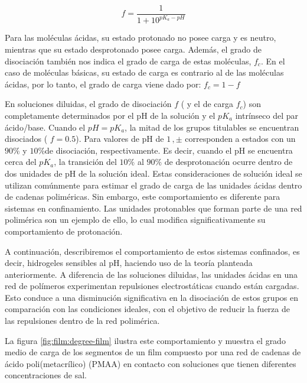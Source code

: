 \begin{equation}
	f = \frac{1}{1+10^{pK_a -pH}}
	\label{eq:film:diso-ideal}
\end{equation}

Para las mol\'eculas \'acidas, su estado protonado no posee carga y es neutro, mientras que su estado desprotonado posee carga. Adem\'as, el grado de disociaci\'on tambi\'en nos indica el grado de carga de estas mol\'eculas, $f_c$. 
En el caso de mol\'eculas b\'asicas, su estado de carga es contrario al de las mol\'eculas \'acidas, por lo tanto, el grado de carga viene dado por: $f_c = 1 -f$


En soluciones diluidas, el grado de disociaci\'on $f$ ( y el de carga $f_c$) son completamente determinados por el pH de la soluci\'on y el $pK_a$ intr\'inseco del par \'acido/base. Cuando el $pH = pK_a$, la mitad de los grupos titulables se encuentran disociados ( $f = 0.5$).  Para valores de pH de $1 \, ,\pm$ corresponden a estados con un $90\%$ y $10\%$de disociaci\'on, respectivamente. Es decir, cuando el pH se encuentra cerca del $pK_a$, la transici\'on del $10\%$ al $90\%$ de desprotonaci\'on ocurre dentro de dos unidades de pH de la soluci\'on ideal.
Estas consideraciones de soluci\'on ideal se utilizan com\'unmente para estimar el grado de carga de las unidades \'acidas dentro de cadenas polim\'ericas. Sin embargo, este comportamiento es diferente para sistemas en confinamiento. Las unidades protonables que forman parte de una red polim\'erica son un ejemplo de ello, lo cual modifica significativamente su comportamiento de protonaci\'on.


A continuaci\'on, describiremos el comportamiento de estos sistemas confinados, es decir, hidrogeles sensibles al pH, haciendo uso de la teor\'ia planteada anteriormente.
A diferencia de las soluciones diluidas, las unidades \'acidas en una red de pol\'imeros experimentan repulsiones electrost\'aticas cuando est\'an cargadas. Esto conduce a una disminuci\'on significativa en la disociaci\'on de estos grupos en comparaci\'on con las condiciones ideales, con el objetivo de reducir la fuerza de las repulsiones dentro de la red polim\'erica.

La figura \ref{fig:film:degree-film} ilustra este comportamiento y muestra el grado medio de carga de los segmentos de un film compuesto por una red de cadenas de \'acido poli(metacrílico) (PMAA) en contacto con soluciones que tienen diferentes concentraciones de sal.



